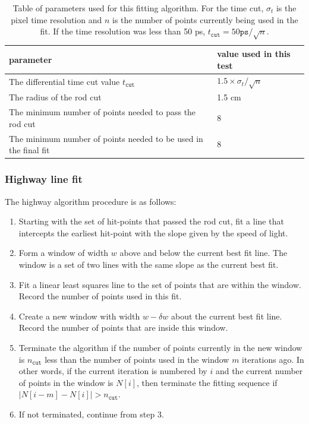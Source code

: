 \documentclass[12pt,twoside,letterpaper]{article}
\begin{document}
\begin{table}[h!]
\begin{tabular}{|l|l|}\hline\hline
\textbf{parameter} & \textbf{value used in this test} \\ \hline
The differential time cut value $t_{\texttt{cut}}$ & $1.5\times\sigma_t / \sqrt{n}$ \\ \hline
The radius of the rod cut & 1.5 cm \\ \hline
The minimum number of points needed to pass the rod cut & 8 \\ \hline
The minimum number of points needed to be used in the final fit & 8 \\ \hline
\end{tabular}
\caption{Table of parameters used for this fitting algorithm. For the time cut, $\sigma_t$ is the pixel time resolution and $n$ is the number of points currently being used in the fit. If the time resolution was less than 50 ps, $t_{\texttt{cut}} = 50\texttt{ps} / \sqrt{n}$. }\label{snake_params}
\end{table}


\subsubsection{Highway line fit} 

The highway algorithm procedure is as follows:

\begin{enumerate}
\item Starting with the set of hit-points that passed the rod cut, fit a line that intercepts the earliest hit-point with the slope given by the speed of light. 
\item Form a window of width $w$ above and below the current best fit line. The window is a set of two lines with the same slope as the current best fit. 
\item Fit a linear least squares line to the set of points that are within the window. Record the number of points used in this fit. 
\item Create a new window with width $w - \delta w$ about the current best fit line. Record the number of points that are inside this window.
\item Terminate the algorithm if the number of points currently in the new window is $n_{\texttt{cut}}$ less than the number of points used in the window $m$ iterations ago. In other words, if the current iteration is numbered by $i$ and the current number of points in the window is $N[i]$, then terminate the fitting sequence if $|N[i - m] - N[i]| > n_{\texttt{cut}}$. 
\item If not terminated, continue from step 3. 
\end{enumerate}
\end{document}
